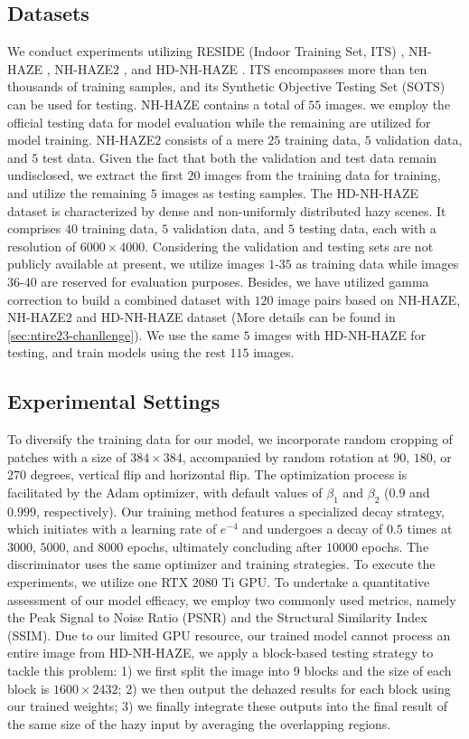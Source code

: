 \documentclass[10pt,twocolumn,letterpaper]{article}
\begin{document}
\subsection{Datasets}
\label{sec:datasets}
 We conduct experiments utilizing RESIDE (Indoor Training Set, ITS) \cite{RESIDE2019}, NH-HAZE \cite{nh-haze2020}, NH-HAZE$2$ \cite{ntire2021}, and HD-NH-HAZE \cite{ntire23}. ITS encompasses more than ten thousands of training samples, and its Synthetic Objective Testing Set (SOTS) can be used for testing. NH-HAZE contains a total of $55$ images. we employ the official testing data for model evaluation while the remaining are utilized for model training. NH-HAZE$2$ consists of a mere $25$ training data, $5$ validation data, and $5$ test data. Given the fact that both the validation and test data remain undisclosed, we extract the first $20$ images from the training data for training, and utilize the remaining $5$ images as testing samples. The HD-NH-HAZE dataset is characterized by dense and non-uniformly distributed hazy scenes. It comprises $40$ training data, $5$ validation data, and $5$ testing data, each with a resolution of $6000\times4000$. Considering the validation and testing sets are not publicly available at present, we utilize images $1$-$35$ as training data while images $36$-$40$ are reserved for evaluation purposes. Besides, we have utilized gamma correction to build a combined dataset with $120$ image pairs based on NH-HAZE, NH-HAZE$2$ and HD-NH-HAZE dataset (More details can be found in \cref{sec:ntire23-chanllenge}). We use the same $5$ images with HD-NH-HAZE for testing, and train models using the rest $115$ images.
\subsection{Experimental Settings}
\label{sec:experimental-settings}
To diversify the training data for our model, we incorporate random cropping of patches with a size of $384\times384$, accompanied by random rotation at $90$, $180$, or $270$ degrees, vertical flip and horizontal flip. The optimization process is facilitated by the Adam optimizer, with default values of $\beta_1$ and $\beta_2$ ($0.9$ and $0.999$, respectively). Our training method features a specialized decay strategy, which initiates with a learning rate of $e^{-4}$ and undergoes a decay of $0.5$ times at $3000$, $5000$, and $8000$ epochs, ultimately concluding after $10000$ epochs. The discriminator uses the same optimizer and training strategies. To execute the experiments, we utilize one RTX $2080$ Ti GPU. To undertake a quantitative assessment of our model efficacy, we employ two commonly used metrics, namely the Peak Signal to Noise Ratio (PSNR) and the Structural Similarity Index (SSIM).
Due to our limited GPU resource, our trained model cannot process an entire image from HD-NH-HAZE, we apply a block-based testing strategy to tackle this problem: 1) we first split the image into 9 blocks and the size of each block is $1600\times2432$; 2) we then output the dehazed results for each block using our trained weights; 3) we finally integrate these outputs into the final result of the same size of the hazy input by averaging the overlapping regions.
\end{document}
